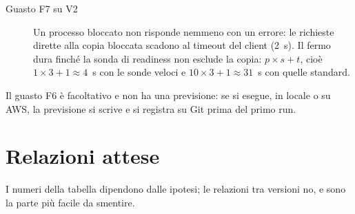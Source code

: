 \begin{description}
  \item[Guasto F7 su V2] Un processo bloccato non risponde nemmeno con un errore: le richieste dirette alla copia bloccata scadono al timeout del client (2~s). Il fermo dura finché la sonda di readiness non esclude la copia: $p \times s + t$, cioè $1 \times 3 + 1 \approx 4$~s con le sonde veloci e $10 \times 3 + 1 \approx 31$~s con quelle standard.
\end{description}

Il guasto F6 è facoltativo e non ha una previsione: se si esegue, in locale o su AWS, la previsione si scrive e si registra su Git prima del primo run.

\section{Relazioni attese}

I numeri della tabella dipendono dalle ipotesi; le relazioni tra versioni no, e sono la parte più facile da smentire.

